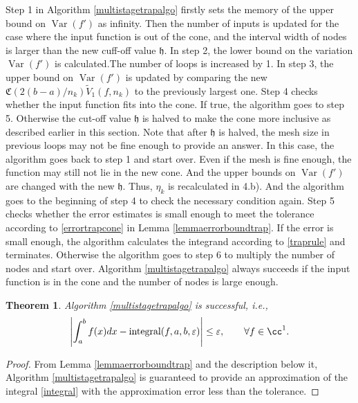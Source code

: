 \documentclass{iitthesis}
\DeclareMathOperator{\Var}{Var}
\newtheorem{theorem}{Theorem}
\theoremstyle{definition}
\theoremstyle{remark}
\begin{document}
Step 1 in Algorithm \ref{multistagetrapalgo} firstly sets the memory of the upper bound on $\Var(f')$ as infinity. Then the number of inputs is updated for the case where the input function is out of the cone, and the interval width of nodes is larger than the new cuff-off value $\mathfrak{h}$. In step 2, the lower bound on the variation $\Var(f')$ is calculated.The number of loops is increased by 1. In step 3, the upper bound on $\Var(f')$ is updated by comparing the new $\mathfrak{C}(2(b-a)/n_{k})\widetilde{V}_1(f,n_k)$ to the previously largest one. Step 4 checks whether the input function fits into the cone. If true, the algorithm goes to step 5. Otherwise the cut-off value $\mathfrak{h}$ is halved to make the cone more inclusive as described earlier in this section. Note that after $\mathfrak{h}$ is halved, the mesh size in previous loops may not be fine enough to provide an answer. In this case, the algorithm goes back to step 1 and start over. Even if the mesh is fine enough, the function may still not lie in the new cone. And the upper bounds on $\Var(f')$ are changed with the new $\mathfrak{h}$. Thus, $\eta_{k}$ is recalculated in 4.b). And the algorithm goes to the beginning of step 4 to check the necessary condition again. Step 5 checks whether the error estimates is small enough to meet the tolerance according to \eqref{errortrapcone} in Lemma \ref{lemmaerrorboundtrap}. If the error is small enough, the algorithm calculates the integrand according to \eqref{traprule} and terminates. Otherwise the algorithm goes to step 6 to multiply the number of nodes and start over.
Algorithm \ref{multistagetrapalgo} always succeeds if the input function is in the cone and the number of nodes is large enough.
\begin{theorem}\label{thmTrap}
    Algorithm \ref{multistagetrapalgo} is successful, i.e.,
    \begin{equation*}
      \left|\int_{a}^{b}f(x)dx-\textup{integral}(f,a,b,\varepsilon)\right|\le\varepsilon, \qquad \forall f\in \cc^1.
    \end{equation*}
\end{theorem}
\begin{proof}
  From Lemma \ref{lemmaerrorboundtrap} and the description below it, Algorithm \ref{multistagetrapalgo} is guaranteed to provide an approximation of the integral \eqref{integral} with the approximation error less than the tolerance.
\end{proof}
\end{document}
